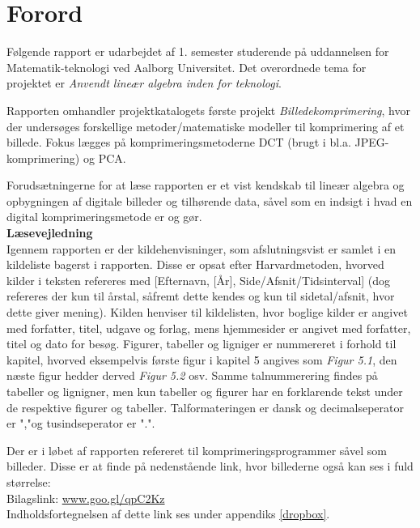 \chapter*{Forord}
Følgende rapport er udarbejdet af 1. semester studerende på uddannelsen for Matematik-teknologi ved Aalborg Universitet. Det overordnede tema for projektet er \textit{Anvendt lineær algebra inden for teknologi}.

Rapporten omhandler projektkatalogets første projekt \textit{Billedekomprimering}, hvor der undersøges forskellige metoder/matematiske modeller til komprimering af et billede. Fokus lægges på komprimeringsmetoderne DCT (brugt i bl.a. JPEG-komprimering) og PCA.

Forudsætningerne for at læse rapporten er et vist kendskab til lineær algebra og opbygningen af digitale billeder og tilhørende data, såvel som en indsigt i hvad en digital komprimeringsmetode er og gør.\\

\textbf{Læsevejledning}\\
Igennem rapporten er der kildehenvisninger, som afslutningsvist er samlet i en kildeliste bagerst i rapporten. Disse er opsat efter Harvardmetoden, hvorved kilder i teksten refereres med [Efternavn, [År], Side/Afsnit/Tidsinterval] (dog refereres der kun til årstal, såfremt dette kendes og kun til sidetal/afsnit, hvor dette giver mening). Kilden henviser til kildelisten, hvor boglige kilder er angivet med forfatter, titel, udgave og forlag, mens hjemmesider er angivet med forfatter, titel og dato for besøg.
Figurer, tabeller og ligniger er nummereret i forhold til kapitel, hvorved eksempelvis første figur i kapitel 5 angives som \textit{Figur 5.1}, den næste figur hedder derved \textit{Figur 5.2} osv. Samme talnummerering findes på tabeller og lignigner, men kun tabeller og figurer har en forklarende tekst under de respektive figurer og tabeller. Talformateringen er dansk og decimalseperator er ","\phantom{i}og tusindseperator er ".".

Der er i løbet af rapporten refereret til komprimeringsprogrammer såvel som billeder. Disse er at finde på nedenstående link, hvor billederne også kan ses i fuld størrelse:\\
Bilagslink: \href{https://goo.gl/qpC2Kz}{www.goo.gl/qpC2Kz}\\
Indholdsfortegnelsen af dette link ses under appendiks \ref{dropbox}.


\phantom{Luft}

\phantom{Luft}


